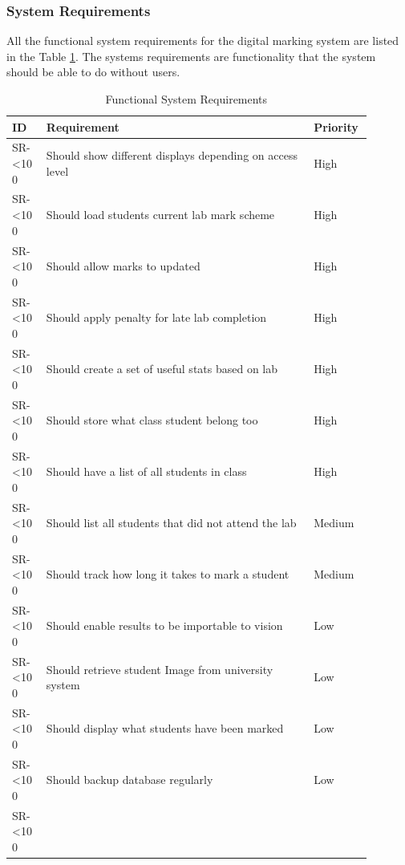 \documentclass[12pt]{article}  %
\newcommand{\rid}[1]{\centering #1-\ifnum\value{requirement}<10 0\fi\arabic{requirement} \stepcounter{requirement}}
\begin{document}
\setcounter{requirement}{1}

\newpage
\subsubsection{System Requirements}

All the functional system requirements for the digital marking system are listed in the Table \ref{table:funct-sys}. The systems requirements are functionality that the system should be able to do without users.

\begin{spacing}{1.2}
\begin{longtable}{|p{0.09\linewidth}|p{0.7\linewidth}|p{0.1\linewidth}|}
\caption{Functional System Requirements} \label{table:funct-sys} \\
\hline

\textbf{ID} & \textbf{Requirement} & \textbf{Priority}\\
\hline \hline


\rid{SR} & Should show different displays depending on access level & High\\ \hline
\rid{SR} & Should load students current lab mark scheme & High\\ \hline
\rid{SR} & Should allow marks to updated & High\\ \hline
\rid{SR} & Should apply penalty for late lab completion & High\\ \hline
\rid{SR} & Should create a set of useful stats based on lab & High\\ \hline
\rid{SR} & Should store what class student belong too & High\\ \hline
\rid{SR} & Should have a list of all students in class & High\\ \hline
\rid{SR} & Should list all students that did not attend the lab & Medium\\ \hline
\rid{SR} & Should track how long it takes to mark a student & Medium \\ \hline
\rid{SR} & Should enable results to be importable to vision & Low\\ \hline
\rid{SR} & Should retrieve student Image from university system & Low\\ \hline
\rid{SR} & Should display what students have been marked & Low\\ \hline
\rid{SR} & Should backup database regularly & Low\\ \hline

\rid{SR} & & \\ \hline

 
\end{longtable}
\end{spacing}
\setcounter{requirement}{1}
\end{document}
